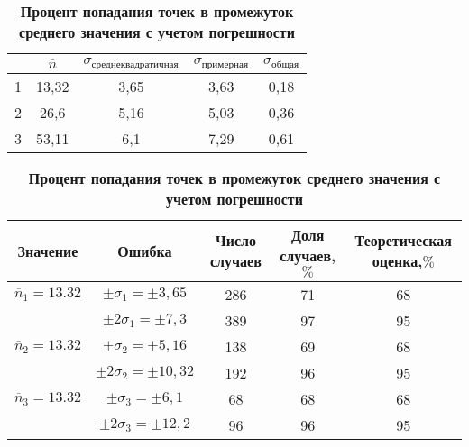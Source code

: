 \documentclass[a4paper, 12pt]{article}%
\begin{document}
\begin{table}
\caption{\textbf{Ошибки и средние значения}}
\begin{tabular}{|c|c|c|c|c|}
\hline
&$\overline{n}$&$\sigma_{\text{среднеквадратичная}}$&$\sigma_{\text{примерная}}$&$\sigma_{\text{общая}}$\\
\hline
1&13,32&3,65&3,63&0,18\\
\hline
2&26,6&5,16&5,03&0,36\\
\hline
3&53,11&6,1&7,29&0,61\\
\hline
\end{tabular}
\caption{\textbf{Процент попадания точек в промежуток среднего значения с учетом погрешности}}
\begin{tabular}{|c|c|c|c|c|}
\hline
Значение&Ошибка&Число случаев&Доля случаев,$\%$&Теоретическая оценка,$\%$ \\
\hline
$\overline{n}_1 = 13.32$ & $\pm \sigma_1 = \pm 3,65$ & 286 & 71 & 68 \\
& $\pm 2 \sigma_1 = \pm 7,3$ & 389 & 97 & 95 \\
\hline
$\overline{n}_2 = 13.32$ & $\pm  \sigma_2 = \pm 5,16$ & 138 & 69 & 68 \\
& $\pm 2 \sigma_2 = \pm 10,32$ & 192 & 96 & 95 \\
\hline
$\overline{n}_3 = 13.32$ & $\pm  \sigma_3 = \pm 6,1$ & 68 & 68 & 68 \\
& $\pm 2 \sigma_3 = \pm 12,2$ & 96 & 96 & 95 \\
\hline
\end{tabular}
\end{table}
\end{document}
